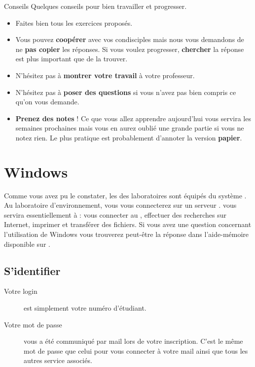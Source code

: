 \documentclass[a4paper,11pt]{style-esi/td}
\begin{document}
\entete
\titre
{}
\lastedit

\bigskip
\tableofcontents

\vfill
\begin{coltbox}{Conseils}
	Quelques conseils pour bien travailler et progresser.
	\begin{itemize}
	\item 
		Faites bien tous les exercices proposés.
	\item 
		Vous pouvez \textbf{coopérer} avec vos condisciples 
		mais nous vous demandons de ne \textbf{pas copier} les réponses. 
		Si vous voulez progresser, \textbf{chercher} la réponse est plus important que de la trouver. 
	\item 
		N'hésitez pas à \textbf{montrer votre travail} à votre professeur.
	\item 
		N'hésitez pas à \textbf{poser des questions} 
		si vous n'avez pas bien compris ce qu'on vous demande.
	\item 
		\textbf{Prenez des notes} ! 
		Ce que vous allez apprendre aujourd'hui 
		vous servira les semaines prochaines 
		mais vous en aurez oublié une grande partie si vous ne notez rien. 
		Le plus pratique est probablement d'annoter la version \textbf{papier}. 
	\end{itemize}
\end{coltbox}
\vfill

\newpage
\section{Windows}

	Comme vous avez pu le constater, 
	les  des laboratoires sont équipés du système .
	Au laboratoire d'environnement, vous vous connecterez sur un serveur . 
	 vous servira essentiellement à : vous connecter au , 
	effectuer des recherches sur Internet, imprimer et transférer des fichiers.
	Si vous avez une question concernant l'utilisation de Windows 
	vous trouverez peut-être la réponse dans l'aide-mémoire disponible sur . 		

	\subsection{S'identifier}

	\begin{infobox}
		\begin{description}
			\item[Votre login]
				est simplement votre numéro d'étudiant.
			\item[Votre mot de passe]
				vous a été communiqué par mail lors de votre inscription.
				C'est le même mot de passe que celui pour vous connecter
				à votre mail  ainsi que tous les autres service associés.
			\end{description}	
	\end{infobox}
\end{document}
